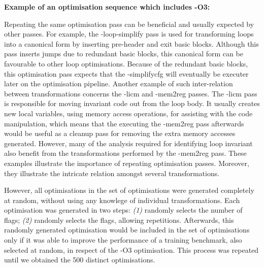  \begin{minipage}{0.9\textwidth}
     \vspace{1em}
     \singlespace
     \noindent\textbf{Example of an optimisation sequence which includes {-O3}:}\vspace{-1ex}
     \vspace{2em}
  \end{minipage}

Repeating the same optimisation pass can be beneficial and usually expected by other passes.
For example, the { -loop-simplify} pass is used for transforming loops into a canonical form by inserting pre-header and exit basic blocks.
Although this pass inserts jumps due to redundant basic blocks, this canonical form can be favourable to other loop optimisations.
Because of the redundant basic blocks, this optimisation pass expects that the { -simplifycfg} will eventually be executer later on the optimisation pipeline.
Another example of such inter-relation between transformations concerns the { -licm} and { -mem2reg} passes.
The { -licm} pass is responsible for moving invariant code out from the loop body. 
It usually creates new local variables, using memory access operations, for assisting with the code manipulation, which means that the executing the { -mem2reg} pass afterwards would be useful as a cleanup pass for removing the extra memory accesses generated.
However, many of the analysis required for identifying loop invariant also benefit from the transformations performed by the { -mem2reg} pass.
These examples illustrate the importance of repeating optimisation passes.
Moreover, they illustrate the intricate relation amongst several transformations. 

However, all optimisations in the set of optimisations were generated completely at random, without using any knowlege of individual transformations.
Each optimisation was generated in two steps: \textit{(1)} randomly selects the number of flags; \textit{(2)} randomly selects the flags, allowing repetitions.
Afterwards, this randomly generated optimisation would be included in the set of optimisations only if it was able to improve the performance of a training benchmark, also selected at random, in respect of the { -O3} optimisation.
This process was repeated until we obtained the 500 distinct optimisations.

